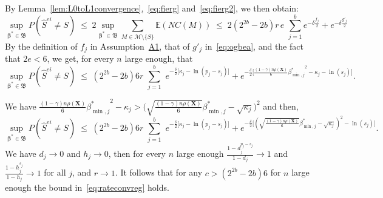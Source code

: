 \documentclass[
  12pt]{article}
\newcommand{\E}{\mathbb{E}}
\newcommand{\M}{\mathcal{M}}
\newcommand{\bbeta}{\boldsymbol{\beta}}
\newcommand{\bX}{\mathbf{X}}
\newcommand{\bB}{\mathfrak{B}}
\begin{document}
 By Lemma~\ref{lem:L0toL1convergence},~\eqref{eq:fierg} and~\eqref{eq:fierg2}, we then obtain:
$$\sup_{\bbeta^*\in \bB}P(\hat{S}^{ei} \neq S)\;\leq\;  2 \sup_{\bbeta^*\in \bB}\sum_{M \in \M\setminus \{S\}} \E\left(NC(M)\right)
     \;\leq\; 2 (2^{2b}-2b) r\,e\,\,\sum_{j=1}^b e^{-\delta \tfrac{f_j}{2}} +e^{-\delta \tfrac{g'_j}{2}}$$
By the definition of $f_j$ in Assumption~\hyperlink{lab:A1}{A1}, that of $g'_j$ in~\eqref{eq:ogbea}, and the fact that $2e<6$,  we get, for every $n$ large enough, that
\begin{equation}\label{eq:gpkr}
    \sup_{\bbeta^*\in \bB} P(\hat{S}^{ei} \neq S)\;\leq\; (2^{2b}-2b)6r\,\,\sum_{j=1}^b\,\, e^{-\tfrac{\delta}{2}\big[\kappa_j-\ln(p_j-s_j)\big]} + e^{-\tfrac{\delta}{2}\big[\frac{(1-\gamma) n\rho(\bX)}{6}{\beta_{\min,j}^*}^2 - \kappa_j -\ln(s_j) \big]}.
\end{equation}

We have $\frac{(1-\gamma) n\rho(\bX)}{6}{\beta_{\min,j}^*}^2 - \kappa_j > \Big(\sqrt{\frac{(1-\gamma) n\rho(\bX)}{6}}{\beta_{\min,j}^*} - \sqrt{\kappa_j}\Big)^2$ and then,
$$\sup_{\bbeta^*\in \bB} P(\hat{S}^{ei} \neq S)\;\leq\; (2^{2b}-2b)6r\,\,\sum_{j=1}^b\,\, e^{-\tfrac{\delta}{2}\big[\kappa_j-\ln(p_j-s_j)\big]} + e^{-\tfrac{\delta}{2}\big[(\sqrt{\frac{(1-\gamma) n\rho(\bX)}{6}}{\beta_{\min,j}^*} - \sqrt{\kappa_j})^2 -\ln(s_j) \big]}.
$$
We have $d_j \to 0$ and $h_j \to 0$, then for every $n$ large enough $\frac{1-d_j^{p_j-s_j}}{1-d_j}\to1$ and $\frac{1-h_j^{s_j}}{1-h_j}\to1$ for all $j$, and $r\to 1$. It follows that for any $c>(2^{2b}-2b)6$ for $n$ large enough the bound in~\eqref{eq:rateconvreg} holds. 
\end{document}
